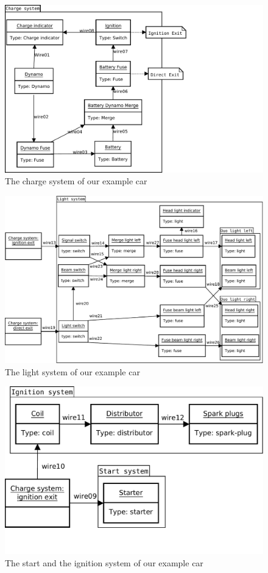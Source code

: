 \documentclass[a4paper,10pt]{article}
\begin{document}
\begin{figure}[htbp]
	\centering
		\includegraphics[width=1.00\textwidth]{ChargeSystem.pdf}
	\caption{The charge system of our example car}
	\label{fig:ChargeSystem}
\end{figure}

\begin{figure}[htbp]
	\centering
		\includegraphics[width=1.00\textwidth]{LightSystem.pdf}
	\caption{The light system of our example car}
	\label{fig:LightSystem}
\end{figure}

\begin{figure}[htbp]
	\centering
		\includegraphics[width=1.00\textwidth]{StartAndIgnitionSystem.pdf}
	\caption{The start and the ignition system of our example car}
	\label{fig:StartAndIgnitionSystem}
\end{figure}
\end{document}
